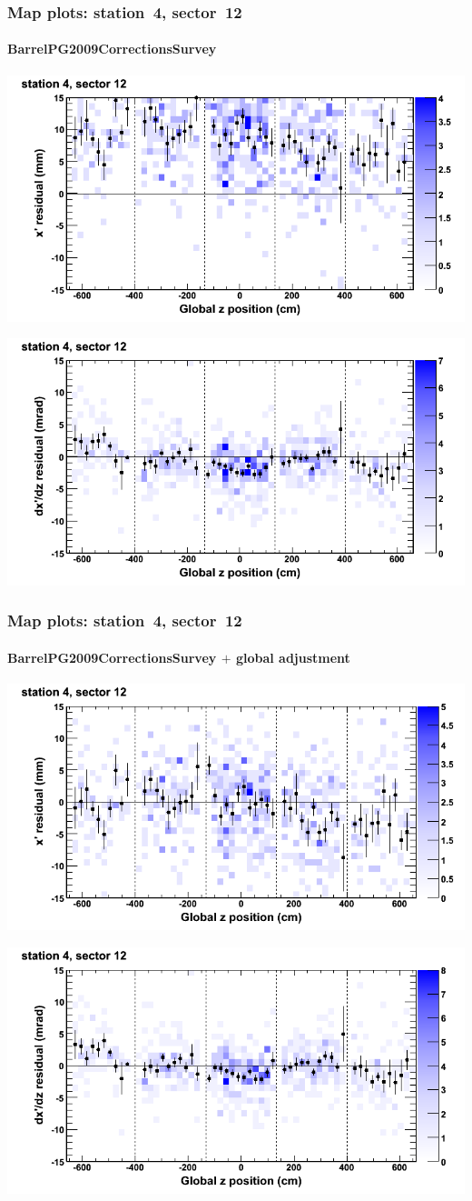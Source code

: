 \documentclass[compress]{beamer}
\begin{document}
\begin{frame}
\frametitle{Map plots: station~4, sector~12}
\framesubtitle{BarrelPG2009CorrectionsSurvey}
\includegraphics[width=0.5\linewidth]{mapplots_01/DTvsz_st4sec12_x.png}

\includegraphics[width=0.5\linewidth]{mapplots_01/DTvsz_st4sec12_dxdz.png}
\end{frame}
\begin{frame}
\frametitle{Map plots: station~4, sector~12}
\framesubtitle{BarrelPG2009CorrectionsSurvey $+$ global adjustment}
\includegraphics[width=0.5\linewidth]{mapplots_re01/DTvsz_st4sec12_x.png}

\includegraphics[width=0.5\linewidth]{mapplots_re01/DTvsz_st4sec12_dxdz.png}
\end{frame}
\end{document}
